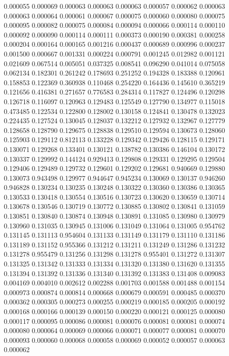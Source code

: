 0.000055
0.000069
0.000063
0.000063
0.000063
0.000057
0.000062
0.000063
0.000063
0.000064
0.000061
0.000067
0.000075
0.000060
0.000080
0.000075
0.000095
0.000082
0.000075
0.000084
0.000094
0.000066
0.000114
0.000110
0.000092
0.000090
0.000114
0.000111
0.000373
0.000190
0.000381
0.000258
0.000204
0.000164
0.000165
0.001216
0.000437
0.000689
0.000996
0.000237
0.001500
0.000667
0.001331
0.000224
0.000791
0.001245
0.012982
0.001121
0.021609
0.067514
0.005051
0.037325
0.008541
0.096290
0.041014
0.075058
0.062134
0.182301
0.261242
0.178693
0.251252
0.194328
0.183388
0.120961
0.158853
0.122369
0.360938
0.110468
0.254220
0.164436
0.145610
0.365219
0.121656
0.416381
0.271657
0.776583
0.284314
0.117827
0.124496
0.120298
0.126718
0.116097
0.120963
0.129483
0.125549
0.127790
0.134977
0.115018
0.473485
0.122534
0.122800
0.128002
0.130158
0.124841
0.130478
0.132023
0.224435
0.127524
0.130045
0.128037
0.132212
0.127932
0.132967
0.127779
0.128658
0.128790
0.129675
0.128838
0.129510
0.129594
0.130673
0.128060
0.125903
0.129112
0.812113
0.133228
0.129342
0.129426
0.128115
0.129171
0.130071
0.129268
0.133401
0.130121
0.138782
0.130386
0.146104
0.130172
0.130337
0.129992
0.144124
0.929413
0.129808
0.129331
0.129295
0.129504
0.129406
0.129489
0.129732
0.129601
0.129202
0.129681
0.940669
0.129880
0.130073
0.943498
0.129977
0.944647
0.945234
0.130069
0.130137
0.946260
0.946828
0.130234
0.130235
0.130248
0.130322
0.130360
0.130386
0.130365
0.130533
0.130418
0.130554
0.130516
0.130723
0.130620
0.130659
0.130714
0.130678
0.130546
0.130719
0.130772
0.130885
0.130802
0.130841
0.131059
0.130851
0.130840
0.130874
0.130948
0.130891
0.131085
0.130980
0.130979
0.130960
0.131035
0.130945
0.131006
0.131049
0.131064
0.131005
0.954762
0.131145
0.131113
0.954604
0.131133
0.131149
0.131179
0.131110
0.131186
0.131189
0.131152
0.955366
0.131212
0.131211
0.131249
0.131286
0.131232
0.131278
0.955479
0.131256
0.131298
0.131278
0.955401
0.131272
0.131307
0.131325
0.131342
0.131333
0.131334
0.131320
0.131380
0.131620
0.131355
0.131394
0.131392
0.131336
0.131340
0.131392
0.131383
0.131408
0.009083
0.004169
0.004010
0.002612
0.002288
0.001703
0.001588
0.001488
0.001154
0.000973
0.000874
0.000814
0.000668
0.000679
0.000591
0.000485
0.000370
0.000362
0.000305
0.000273
0.000255
0.000219
0.000185
0.000205
0.000192
0.000168
0.000166
0.000139
0.000150
0.000220
0.000121
0.000125
0.000080
0.000117
0.000095
0.000086
0.000081
0.000076
0.000081
0.000081
0.000074
0.000080
0.000064
0.000069
0.000066
0.000071
0.000077
0.000081
0.000070
0.000093
0.000060
0.000068
0.000058
0.000069
0.000052
0.000057
0.000063
0.000062
